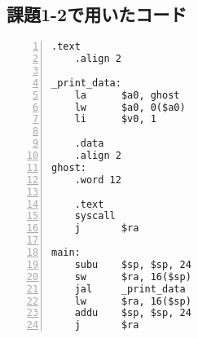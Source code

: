 \subsection{課題1-2で用いたコード} \label{sec:p1-2}
\begin{Verbatim}[numbers=left, xleftmargin=10mm, numbersep=6pt,
                    fontsize=\small, baselinestretch=0.8]
    .text
    .align 2

_print_data:
    la      $a0, ghost
    lw      $a0, 0($a0)
    li      $v0, 1

    .data
    .align 2
ghost:
    .word 12

    .text
    syscall
    j       $ra

main:
    subu    $sp, $sp, 24
    sw      $ra, 16($sp)
    jal     _print_data
    lw      $ra, 16($sp)
    addu    $sp, $sp, 24
    j       $ra
\end{Verbatim}


